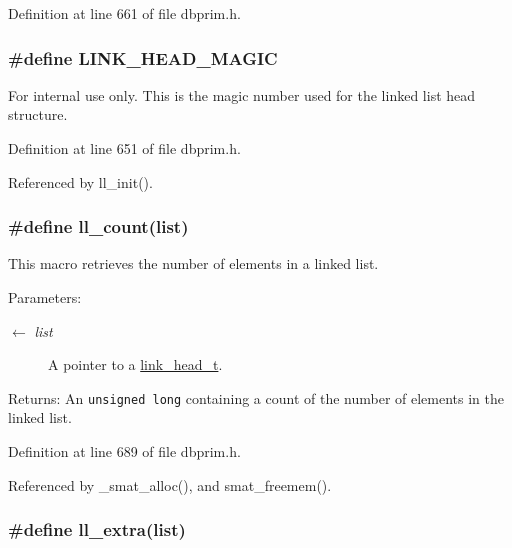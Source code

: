Definition at line 661 of file dbprim.h.\hypertarget{group__dbprim__link_ga13}{
\subsubsection[LINK\_\-HEAD\_\-MAGIC]{\setlength{\rightskip}{0pt plus 5cm}\#define LINK\_\-HEAD\_\-MAGIC}}
\label{group__dbprim__link_ga13}


\begin{Desc}
\item[For internal use only.]
This is the magic number used for the linked list head structure.\end{Desc}


Definition at line 651 of file dbprim.h.

Referenced by ll\_\-init().\hypertarget{group__dbprim__link_ga16}{
\subsubsection[ll\_\-count]{\setlength{\rightskip}{0pt plus 5cm}\#define ll\_\-count(list)}}
\label{group__dbprim__link_ga16}


This macro retrieves the number of elements in a linked list.

\begin{Desc}
\item[Parameters:]
\begin{description}
\item[\mbox{$\leftarrow$} {\em list}]A pointer to a \hyperlink{group__dbprim__link_ga0}{link\_\-head\_\-t}.\end{description}
\end{Desc}
\begin{Desc}
\item[Returns:]An {\tt unsigned long} containing a count of the number of elements in the linked list.\end{Desc}


Definition at line 689 of file dbprim.h.

Referenced by \_\-smat\_\-alloc(), and smat\_\-freemem().\hypertarget{group__dbprim__link_ga19}{
\subsubsection[ll\_\-extra]{\setlength{\rightskip}{0pt plus 5cm}\#define ll\_\-extra(list)}}
\label{group__dbprim__link_ga19}


